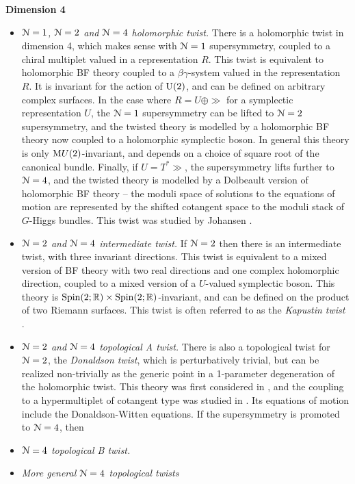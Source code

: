 \documentclass[10pt, oneside]{article}
\begin{document}
\textbf{Dimension 4}
\begin{itemize}
 \item \emph{$\mathcal{N}=1$, $\mathcal{N}=2$ and $\mathcal{N}=4$ holomorphic twist.} There is a holomorphic twist in dimension 4, which makes sense with $\mathcal{N}=1$ supersymmetry, coupled to a chiral multiplet valued in a representation $R$.  This twist is equivalent to holomorphic BF theory coupled to a $\beta \gamma$-system valued in the representation $R$.  It is invariant for the action of $\mathrm{U}(2)$, and can be defined on arbitrary complex surfaces.  In the case where $R = U \oplus \gg$ for a symplectic representation $U$, the $\mathcal{N}=1$ supersymmetry can be lifted to $\mathcal{N}=2$ supersymmetry, and the twisted theory is modelled by a holomorphic BF theory now coupled to a holomorphic symplectic boson.  In general this theory is only $\mathrm{M}U(2)$-invariant, and depends on a choice of square root of the canonical bundle.  Finally, if $U = T^*\gg$, the supersymmetry lifts further to $\mathcal{N}=4$, and the twisted theory is modelled by a Dolbeault version of holomorphic BF theory -- the moduli space of solutions to the equations of motion are represented by the shifted cotangent space to the moduli stack of $G$-Higgs bundles.  This twist was studied by Johansen \cite{Johansen}.
 \item \emph{$\mathcal{N}=2$ and $\mathcal{N}=4$ intermediate twist.}  If $\mathcal{N}=2$ then there is an intermediate twist, with three invariant directions.  This twist is equivalent to a mixed version of BF theory with two real directions and one complex holomorphic direction, coupled to a mixed version of a $U$-valued symplectic boson.  This theory is $\mathrm{Spin}(2;\mathbb R) \times \mathrm{Spin}(2;\mathbb R)$-invariant, and can be defined on the product of two Riemann surfaces.  This twist is often referred to as the \emph{Kapustin twist} \cite{KapustinHolo}.
 \item \emph{$\mathcal{N}=2$ and $\mathcal{N}=4$ topological A twist.} There is also a topological twist for $\mathcal{N}=2$, the \emph{Donaldson twist}, which is perturbatively trivial, but can be realized non-trivially as the generic point in a 1-parameter degeneration of the holomorphic twist.  This theory was first considered in \cite{WittenTQFT}, and the coupling to a hypermultiplet of cotangent type was studied in \cite{AlvarezLabastida, HyunParkPark}.  Its equations of motion include the Donaldson-Witten equations.  If the supersymmetry is promoted to $\mathcal{N}=4$, then  \cite{Lozano, VafaWitten}
 \item \emph{$\mathcal{N}=4$ topological B twist.} \cite{KapustinWitten}
 \item \emph{More general $\mathcal{N}=4$ topological twists} \cite{KapustinWitten, ElliottYoo1}
\end{itemize}
\end{document}
